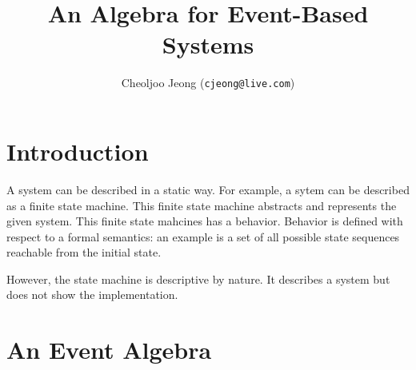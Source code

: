 \documentclass{proc}
\begin{document}
\title{\Large\bf An Algebra for Event-Based Systems}
\author{\normalsize Cheoljoo Jeong ({\tt{cjeong@live.com}})}
\date{}
\maketitle

\begin{abstract}
\end{abstract}

\section{Introduction}
A system can be described in a static way. For example, a sytem can be
described as a finite state machine. This finite state machine abstracts and 
represents the given system. 
This finite state mahcines has a behavior. Behavior is defined with respect to
a formal semantics: an example is a set of all possible state sequences
reachable from the initial state. 

However, the state machine is descriptive by nature. It describes a system but
does not show the implementation.

\section{An Event Algebra}






\end{document}
